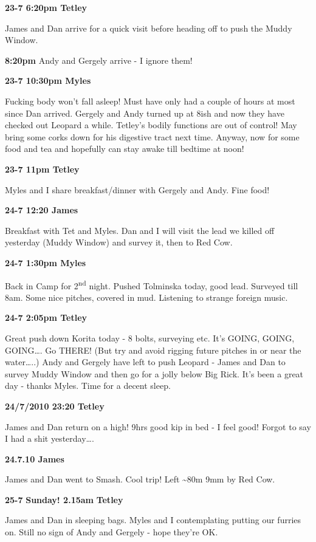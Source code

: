 \textbf{23-7 6:20pm Tetley}

James and Dan arrive for a quick visit before heading off to push the
Muddy Window.

\textbf{8:20pm} Andy and Gergely arrive - I ignore them!

\textbf{23-7 10:30pm Myles}

Fucking body won't fall asleep! Must have only had a couple of hours at
most since Dan arrived. Gergely and Andy turned up at 8ish and now they
have checked out Leopard a while. Tetley's bodily functions are out of
control! May bring some corks down for his digestive tract next time.
Anyway, now for some food and tea and hopefully can stay awake till
bedtime at noon!

\textbf{23-7 11pm Tetley}

Myles and I share breakfast/dinner with Gergely and Andy. Fine food!

\textbf{24-7 12:20 James}

Breakfast with Tet and Myles. Dan and I will visit the lead we killed
off yesterday (Muddy Window) and survey it, then to Red Cow.

\textbf{24-7 1:30pm Myles}

Back in Camp for 2\textsuperscript{nd} night. Pushed Tolminska today,
good lead. Surveyed till 8am. Some nice pitches, covered in mud.
Listening to strange foreign music.

\textbf{24-7 2:05pm Tetley}

Great push down Korita today - 8 bolts, surveying etc. It's GOING,
GOING, GOING\ldots{}. Go THERE! (But try and avoid rigging future
pitches in or near the water\ldots{}..) Andy and Gergely have left to
push Leopard - James and Dan to survey Muddy Window and then go for a
jolly below Big Rick. It's been a great day - thanks Myles. Time for a
decent sleep.

\textbf{24/7/2010 23:20 Tetley}

James and Dan return on a high! 9hrs good kip in bed - I feel good!
Forgot to say I had a shit yesterday\ldots{}.

\textbf{24.7.10 James}

James and Dan went to Smash. Cool trip! Left \textasciitilde{}80m 9mm by
Red Cow.

\textbf{25-7} \textbf{Sunday! 2.15am} \textbf{Tetley}

James and Dan in sleeping bags. Myles and I contemplating putting our
furries on. Still no sign of Andy and Gergely - hope they're OK.

